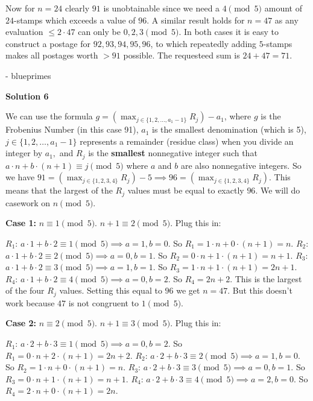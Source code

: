 \begin{enumerate}
 
Now for $n = 24$ clearly $91$ is unobtainable since we need a $4 \pmod {5}$ amount of $24$-stamps which exceeds a value of $96$. A similar result holds for $n = 47$ as any evaluation $\le 2 \cdot 47$ can only be $0, 2, 3 \pmod{5}$. In both cases it is easy to construct a postage for $92, 93, 94, 95, 96$, to which repeatedly adding $5$-stamps makes all postages worth $>91$ possible. The requesteed sum is $24 + 47 = \boxed{71}$.

 - blueprimes

 



\textbf{Solution 6}

We can use the formula $g = \left( \max_{j \in \{1, 2, \ldots, a_1-1\}} R_j \right) - a_1$, where $g$ is the Frobenius Number (in this case 91), $a_1$ is the smallest denomination (which is 5), $j \in \{1, 2, \ldots, a_1-1\}$ represents a remainder (residue class) when you divide an integer by $a_1,$ and $R_j$ is the \textbf{smallest} nonnegative integer such that $a \cdot n + b \cdot (n + 1) \equiv j \pmod{5}$ where $a$ and $b$ are also nonnegative integers. So we have $91 = \left( \max_{j \in \{1, 2, 3, 4\}} R_j \right) - 5 \implies 96 = \left( \max_{j \in \{1, 2, 3, 4\}} R_j \right).$ This means that the largest of the $R_j$ values must be equal to exactly $96.$ We will do casework on $n \pmod{5}.$

 
\textbf{Case 1:} $n \equiv 1 \pmod{5}.$
$n + 1 \equiv 2 \pmod{5}.$ Plug this in:

 $R_1$: $a \cdot 1 + b \cdot 2 \equiv 1 \pmod{5} \implies a = 1, b = 0.$ So $R_1 = 1 \cdot n + 0 \cdot (n + 1) = n.$
$R_2$: $a \cdot 1 + b \cdot 2 \equiv 2 \pmod{5} \implies a = 0, b = 1.$ So $R_2 = 0 \cdot n + 1 \cdot (n + 1) = n + 1.$
$R_3$: $a \cdot 1 + b \cdot 2 \equiv 3 \pmod{5} \implies a = 1, b = 1.$ So $R_3 = 1 \cdot n + 1 \cdot (n + 1) = 2n + 1.$
$R_4$: $a \cdot 1 + b \cdot 2 \equiv 4 \pmod{5} \implies a = 0, b = 2.$ So $R_4 = 2n + 2.$ This is the largest of the four $R_j$ values. Setting this equal to $96$ we get $n = 47.$ But this doesn't work because $47$ is not congruent to $1 \pmod{5}.$ 

 
\textbf{Case 2:} $n \equiv 2 \pmod{5}.$
$n + 1 \equiv 3 \pmod{5}.$ Plug this in:

 $R_1$: $a \cdot 2 + b \cdot 3 \equiv 1 \pmod{5} \implies a = 0, b = 2.$ So $R_1 = 0 \cdot n + 2 \cdot (n + 1) = 2n + 2.$
$R_2$: $a \cdot 2 + b \cdot 3 \equiv 2 \pmod{5} \implies a = 1, b = 0.$ So $R_2 = 1 \cdot n + 0 \cdot (n + 1) =  n.$
$R_3$: $a \cdot 2 + b \cdot 3 \equiv 3 \pmod{5} \implies a = 0, b = 1.$ So $R_3 = 0 \cdot n + 1 \cdot (n + 1) = n + 1.$
$R_4$: $a \cdot 2 + b \cdot 3 \equiv 4 \pmod{5} \implies a = 2, b = 0.$ So $R_4 = 2 \cdot n + 0 \cdot (n + 1) = 2n.$ 


\end{enumerate}
